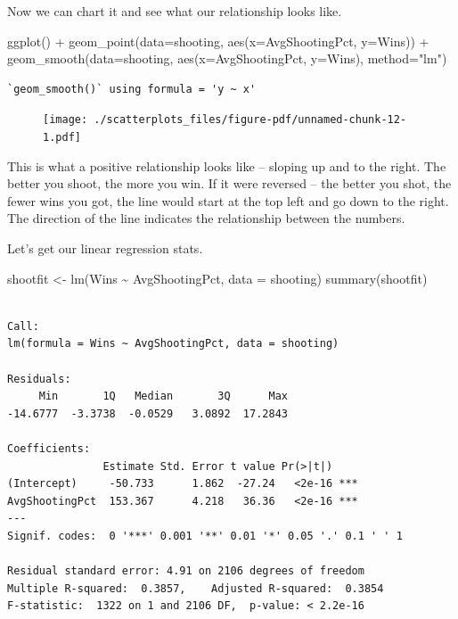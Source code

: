 \documentclass[
  letterpaper,
  DIV=11,
  numbers=noendperiod]{scrreprt}
\newenvironment{Shaded}{\begin{snugshade}}{\end{snugshade}}
\newcommand{\AttributeTok}[1]{\textcolor[rgb]{0.40,0.45,0.13}{#1}}
\newcommand{\FunctionTok}[1]{\textcolor[rgb]{0.28,0.35,0.67}{#1}}
\newcommand{\NormalTok}[1]{\textcolor[rgb]{0.00,0.23,0.31}{#1}}
\newcommand{\OtherTok}[1]{\textcolor[rgb]{0.00,0.23,0.31}{#1}}
\newcommand{\SpecialCharTok}[1]{\textcolor[rgb]{0.37,0.37,0.37}{#1}}
\newcommand{\StringTok}[1]{\textcolor[rgb]{0.13,0.47,0.30}{#1}}
\begin{document}
Now we can chart it and see what our relationship looks like.

\begin{Shaded}
\begin{Highlighting}[]
\FunctionTok{ggplot}\NormalTok{() }\SpecialCharTok{+} 
  \FunctionTok{geom\_point}\NormalTok{(}\AttributeTok{data=}\NormalTok{shooting, }\FunctionTok{aes}\NormalTok{(}\AttributeTok{x=}\NormalTok{AvgShootingPct, }\AttributeTok{y=}\NormalTok{Wins)) }\SpecialCharTok{+}
  \FunctionTok{geom\_smooth}\NormalTok{(}\AttributeTok{data=}\NormalTok{shooting, }\FunctionTok{aes}\NormalTok{(}\AttributeTok{x=}\NormalTok{AvgShootingPct, }\AttributeTok{y=}\NormalTok{Wins), }\AttributeTok{method=}\StringTok{"lm"}\NormalTok{)}
\end{Highlighting}
\end{Shaded}

\begin{verbatim}
`geom_smooth()` using formula = 'y ~ x'
\end{verbatim}

\begin{figure}[H]

{\centering \texttt{[image: ./scatterplots\_files/figure-pdf/unnamed-chunk-12-1.pdf]}

}

\end{figure}

This is what a positive relationship looks like -- sloping up and to the
right. The better you shoot, the more you win. If it were reversed --
the better you shot, the fewer wins you got, the line would start at the
top left and go down to the right. The direction of the line indicates
the relationship between the numbers.

Let's get our linear regression stats.

\begin{Shaded}
\begin{Highlighting}[]
\NormalTok{shootfit }\OtherTok{\textless{}{-}} \FunctionTok{lm}\NormalTok{(Wins }\SpecialCharTok{\textasciitilde{}}\NormalTok{ AvgShootingPct, }\AttributeTok{data =}\NormalTok{ shooting)}
\FunctionTok{summary}\NormalTok{(shootfit)}
\end{Highlighting}
\end{Shaded}

\begin{verbatim}

Call:
lm(formula = Wins ~ AvgShootingPct, data = shooting)

Residuals:
     Min       1Q   Median       3Q      Max 
-14.6777  -3.3738  -0.0529   3.0892  17.2843 

Coefficients:
               Estimate Std. Error t value Pr(>|t|)    
(Intercept)     -50.733      1.862  -27.24   <2e-16 ***
AvgShootingPct  153.367      4.218   36.36   <2e-16 ***
---
Signif. codes:  0 '***' 0.001 '**' 0.01 '*' 0.05 '.' 0.1 ' ' 1

Residual standard error: 4.91 on 2106 degrees of freedom
Multiple R-squared:  0.3857,    Adjusted R-squared:  0.3854 
F-statistic:  1322 on 1 and 2106 DF,  p-value: < 2.2e-16
\end{verbatim}
\end{document}
